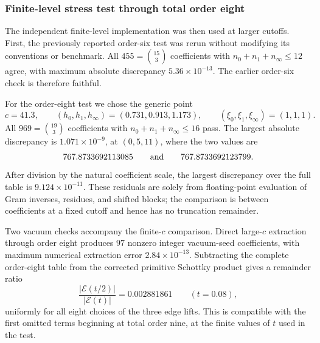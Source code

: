 \documentclass[11pt]{article}
\begin{document}
\subsubsection{Finite-level stress test through total order eight}

The independent finite-level implementation
 was then used at larger cutoffs.
First, the previously reported order-six test was rerun without modifying
its conventions or benchmark.  All
\(455=\binom{15}{3}\) coefficients with
\(n_0+n_1+n_\infty\leq12\) agree, with maximum absolute discrepancy
\(5.36\times10^{-13}\).  The earlier order-six check is therefore faithful.

For the order-eight test we chose the generic point
\begin{equation}
 c=41.3,
 \qquad (h_0,h_1,h_\infty)=(0.731,0.913,1.173),
 \qquad (\xi_0,\xi_1,\xi_\infty)=(1,1,1).
 \label{eq:order-eight-benchmark}
\end{equation}
All \(969=\binom{19}{3}\) coefficients with
\(n_0+n_1+n_\infty\leq16\) pass.  The largest absolute discrepancy is
\(1.071\times10^{-9}\), at \((0,5,11)\), where the two values are
\begin{equation}
 767.8733692113085
 \qquad\hbox{and}\qquad
 767.8733692123799.
 \label{eq:order-eight-largest-error}
\end{equation}
After division by the natural coefficient scale, the largest discrepancy
over the full table is \(9.124\times10^{-11}\).  These residuals are solely
from floating-point evaluation of Gram inverses, residues, and shifted
blocks; the comparison is between coefficients at a fixed cutoff and hence
has no truncation remainder.

Two vacuum checks accompany the finite-\(c\) comparison.  Direct large-\(c\)
extraction through order eight produces \(97\) nonzero integer vacuum-seed
coefficients, with maximum numerical extraction error
\(2.84\times10^{-13}\).  Subtracting the complete order-eight table from the
corrected primitive Schottky product gives a remainder ratio
\begin{equation}
 \frac{|\mathcal E(t/2)|}{|\mathcal E(t)|}=0.002881861
 \qquad (t=0.08),
 \label{eq:order-eight-schottky-remainder}
\end{equation}
uniformly for all eight choices of the three edge lifts.  This is compatible
with the first omitted terms beginning at total order nine, at the finite
values of \(t\) used in the test.
\end{document}
